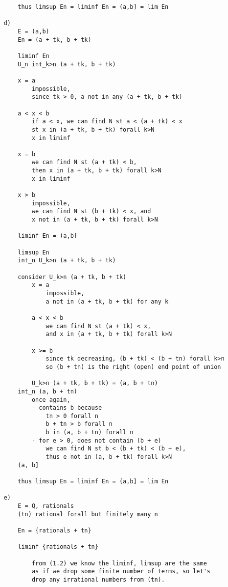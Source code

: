 \documentclass{article}
\begin{document}
\begin{flushleft}
\begin{verbatim}
        thus limsup En = liminf En = (a,b] = lim En 

    d)
        E = (a,b)
        En = (a + tk, b + tk)

        liminf En
        U_n int_k>n (a + tk, b + tk)

        x = a 
            impossible,
            since tk > 0, a not in any (a + tk, b + tk)

        a < x < b 
            if a < x, we can find N st a < (a + tk) < x 
            st x in (a + tk, b + tk) forall k>N
            x in liminf 

        x = b 
            we can find N st (a + tk) < b,
            then x in (a + tk, b + tk) forall k>N 
            x in liminf 

        x > b
            impossible, 
            we can find N st (b + tk) < x, and 
            x not in (a + tk, b + tk) forall k>N

        liminf En = (a,b]

        limsup En 
        int_n U_k>n (a + tk, b + tk)

        consider U_k>n (a + tk, b + tk)
            x = a 
                impossible, 
                a not in (a + tk, b + tk) for any k 

            a < x < b 
                we can find N st (a + tk) < x,
                and x in (a + tk, b + tk) forall k>N 

            x >= b 
                since tk decreasing, (b + tk) < (b + tn) forall k>n
                so (b + tn) is the right (open) end point of union 

            U_k>n (a + tk, b + tk) = (a, b + tn)
        int_n (a, b + tn)
            once again,
            - contains b because 
                tn > 0 forall n
                b + tn > b forall n 
                b in (a, b + tn) forall n 
            - for e > 0, does not contain (b + e)
                we can find N st b < (b + tk) < (b + e),
                thus e not in (a, b + tk) forall k>N
        (a, b]

        thus limsup En = liminf En = (a,b] = lim En 

    e)
        E = Q, rationals 
        (tn) rational forall but finitely many n 

        En = {rationals + tn}

        liminf {rationals + tn}
            
            from (1.2) we know the liminf, limsup are the same 
            as if we drop some finite number of terms, so let's 
            drop any irrational numbers from (tn).


\end{verbatim}
\end{flushleft}
\end{document}

